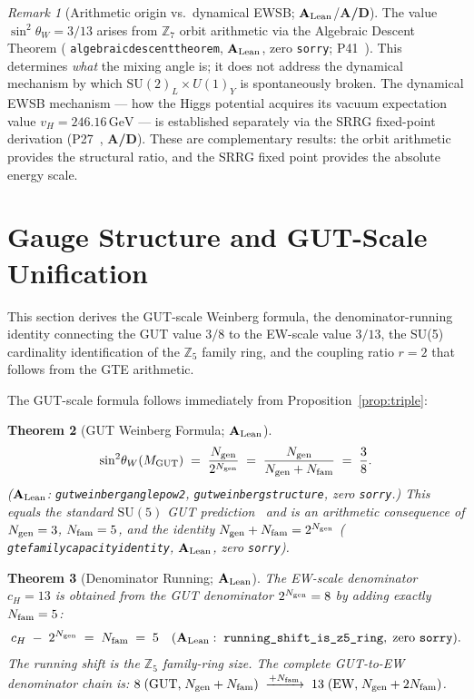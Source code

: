 \documentclass[11pt]{article}
\newtheorem{theorem}{Theorem}[section]
\theoremstyle{remark}
\newtheorem{remark}[theorem]{Remark}
\newcommand{\Ngen}{N_{\rm gen}}
\newcommand{\Nfam}{N_{\rm fam}}
\newcommand{\cH}{c_H}
\newcommand{\lean}[1]{%
  \penalty-100
  \begingroup\def\_{\textunderscore\allowbreak}\texttt{#1}\endgroup}
\newcommand{\sinwsq}{\sin^2\!\theta_W}
\newcommand{\CatAL}{\ensuremath{\textbf{A}_{\rm Lean}}}
\newcommand{\CatAD}{\textbf{A/D}}
\begin{document}
\begin{remark}[Arithmetic origin vs.\ dynamical EWSB; \CatAL/\CatAD]
\label{rem:arithmetic_vs_ewsb}
The value $\sinwsq = 3/13$ arises from $\mathbb{Z}_7$ orbit arithmetic via the
Algebraic Descent Theorem (\lean{algebraic\_descent\_theorem}, \CatAL, zero \texttt{sorry};
P41~\cite{SpivackCMCA}).  This determines \emph{what} the mixing angle is; it does not
address the dynamical mechanism by which $\mathrm{SU}(2)_L \times U(1)_Y$ is
spontaneously broken.  The dynamical EWSB mechanism --- how the Higgs potential
acquires its vacuum expectation value $v_H = 246.16\,\text{GeV}$ --- is established
separately via the SRRG fixed-point derivation (P27~\cite{SpivackSRRG}, \CatAD).
These are complementary results: the orbit arithmetic provides the structural ratio, and
the SRRG fixed point provides the absolute energy scale.
\end{remark}

\section{Gauge Structure and GUT-Scale Unification}
\label{sec:gut}

This section derives the GUT-scale Weinberg formula, the denominator-running identity
connecting the GUT value $3/8$ to the EW-scale value $3/13$, the SU(5) cardinality
identification of the $\mathbb{Z}_5$ family ring, and the coupling ratio $r = 2$ that
follows from the GTE arithmetic.

The GUT-scale formula follows immediately from Proposition~\ref{prop:triple}:

\begin{theorem}[GUT Weinberg Formula; $\CatAL$]
\label{thm:gut_weinberg}
\begin{equation}
  \sinwsq(M_{\rm GUT})
  \;=\; \frac{\Ngen}{2^{\Ngen}}
  \;=\; \frac{\Ngen}{\Ngen + \Nfam}
  \;=\; \frac{3}{8}.
\label{eq:gut_weinberg}
\end{equation}
($\CatAL$: \lean{gut\_weinberg\_angle\_pow2}, \lean{gut\_weinberg\_structure},
zero \texttt{sorry}.)
This equals the standard $\mathrm{SU}(5)$ GUT prediction~\cite{GeorgiGlashow1974}
and is an \emph{arithmetic consequence} of $\Ngen = 3$, $\Nfam = 5$, and the identity
$\Ngen + \Nfam = 2^{\Ngen}$ (\lean{gte\_family\_capacity\_identity}, $\CatAL$, zero \texttt{sorry}).
\end{theorem}

\begin{theorem}[Denominator Running; $\CatAL$]
\label{thm:running}
The EW-scale denominator $\cH = 13$ is obtained from the GUT denominator $2^{\Ngen} = 8$ by
adding exactly $\Nfam = 5$:
\begin{equation}
  \cH \;-\; 2^{\Ngen} \;=\; \Nfam \;=\; 5
  \quad(\CatAL:\;\lean{running\_shift\_is\_z5\_ring},\;\text{zero }\texttt{sorry}).
\label{eq:running_shift}
\end{equation}
The running shift is the $\mathbb{Z}_5$ family-ring size.
The complete GUT-to-EW denominator chain is:
$8 \;(\text{GUT,}\; \Ngen + \Nfam) \;\xrightarrow{+\Nfam}\; 13 \;(\text{EW,}\; \Ngen + 2\Nfam)$.
\end{theorem}
\end{document}
